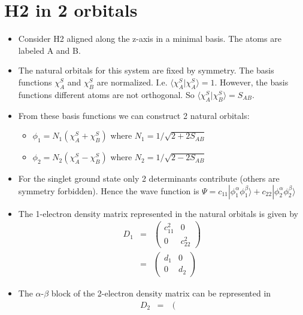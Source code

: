 \documentclass{amsart}
\begin{document}
\section{H2 in 2 orbitals}

\begin{itemize}
\item Consider H2 aligned along the z-axis in a minimal basis. The atoms are labeled A and B.
\item The natural orbitals for this system are fixed by symmetry. The basis functions $\chi_A^S$ and 
        $\chi_B^S$ are normalized. I.e. $\langle \chi_A^S|\chi_A^S\rangle = 1$. However, the basis 
        functions  different atoms are not orthogonal. So $\langle \chi_A^S|\chi_B^S\rangle = S_{AB}$.
\item From these basis functions we can construct 2 natural orbitals:
         \begin{itemize}
         \item $\phi_1 = N_1 \left(\chi_A^S + \chi_B^S\right)$ where $N_1 = 1/\sqrt{2+2S_{AB}}$
         \item $\phi_2 = N_2 \left(\chi_A^S - \chi_B^S\right)$ where $N_2 = 1/\sqrt{2-2S_{AB}}$
         \end{itemize}
\item For the singlet ground state only 2 determinants contribute (others are symmetry forbidden). Hence  
        the wave function is 
        $\Psi = c_{11}|\phi_1^\alpha\phi_1^\beta\rangle + c_{22}|\phi_2^\alpha\phi_2^\beta\rangle $
\item The 1-electron density matrix represented in the natural orbitals is given by
         \begin{eqnarray}
         D_{1} &=&
         \left(\begin{matrix}
         c_{11}^2 & 0 \\
         0 & c_{22}^2
         \end{matrix}\right) \\
         &=&
         \left(\begin{matrix}
         d_{1} & 0 \\
         0 & d_{2}
         \end{matrix}\right)
         \end{eqnarray}
\item The $\alpha$-$\beta$ block of the 2-electron density matrix can be represented in
        \begin{eqnarray}
         D_{2} &=&
         \left(\begin{matrix}

\end{matrix}
\end{eqnarray}
\end{itemize}
\end{document}
